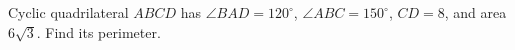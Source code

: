 Cyclic quadrilateral $ABCD$ has $\angle BAD=120^\circ$, $\angle ABC=150^\circ$, $CD=8$, and area $6\sqrt3$. Find its perimeter.
